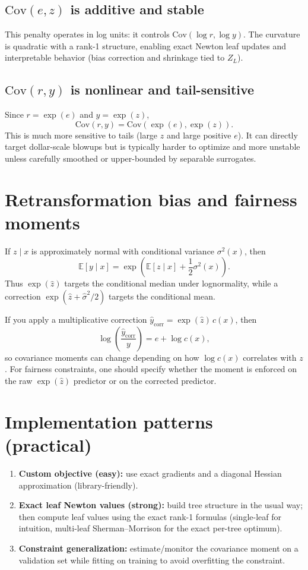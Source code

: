 \documentclass[11pt]{article}
\theoremstyle{plain}
\theoremstyle{definition}
\newcommand{\E}{\mathbb{E}}
\newcommand{\1}{\mathbf{1}}
\newcommand{\Cov}{\text{Cov}}
\begin{document}
{\subsection{\texorpdfstring{\(\Cov(e,z)\)}{Cov(e,z)} is additive and stable}
This penalty operates in log units: it controls \(\Cov(\log r,\log y)\). The curvature is quadratic with a rank-1 structure, enabling exact Newton leaf updates and interpretable behavior (bias correction and shrinkage tied to \(Z_L\)).

\subsection{\texorpdfstring{\(\Cov(r,y)\)}{Cov(r,y)} is nonlinear and tail-sensitive}
Since \(r=\exp(e)\) and \(y=\exp(z)\),
\[
\Cov(r,y)=\Cov(\exp(e),\exp(z)).
\]
This is much more sensitive to tails (large \(z\) and large positive \(e\)). It can directly target dollar-scale blowups but is typically harder to optimize and more unstable unless carefully smoothed or upper-bounded by separable surrogates.

\section{Retransformation bias and fairness moments}

If \(z\mid x\) is approximately normal with conditional variance \(\sigma^2(x)\), then
\[
\E[y\mid x] = \exp\!\left(\E[z\mid x] + \frac{1}{2}\sigma^2(x)\right).
\]
Thus \(\exp(\hat z)\) targets the conditional median under lognormality, while a correction \(\exp(\hat z+\hat\sigma^2/2)\) targets the conditional mean.

If you apply a multiplicative correction \(\hat y_{\mathrm{corr}}=\exp(\hat z)\,c(x)\), then
\[
\log\left(\frac{\hat y_{\mathrm{corr}}}{y}\right)=e+\log c(x),
\]
so covariance moments can change depending on how \(\log c(x)\) correlates with \(z\). For fairness constraints, one should specify whether the moment is enforced on the raw \(\exp(\hat z)\) predictor or on the corrected predictor.

\section{Implementation patterns (practical)}

\begin{enumerate}[leftmargin=*]
\item \textbf{Custom objective (easy):} use exact gradients and a diagonal Hessian approximation (library-friendly).
\item \textbf{Exact leaf Newton values (strong):} build tree structure in the usual way; then compute leaf values using the exact rank-1 formulas (single-leaf for intuition, multi-leaf Sherman--Morrison for the exact per-tree optimum).
\item \textbf{Constraint generalization:} estimate/monitor the covariance moment on a validation set while fitting on training to avoid overfitting the constraint.
\end{enumerate}

}
\end{document}
